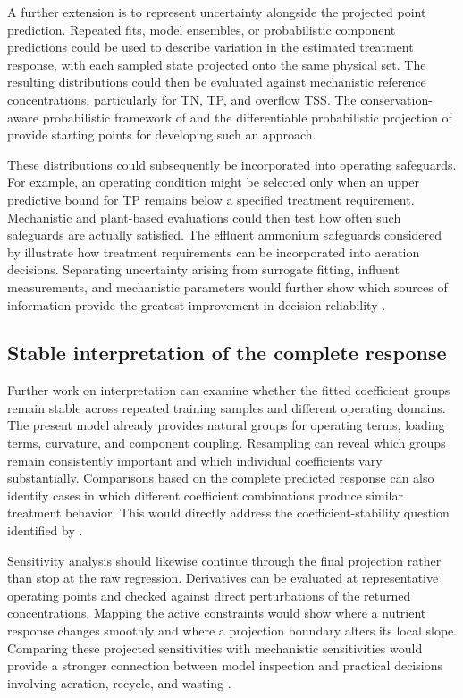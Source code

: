 A further extension is to represent uncertainty alongside the projected point prediction. Repeated fits, model ensembles, or probabilistic component predictions could be used to describe variation in the estimated treatment response, with each sampled state projected onto the same physical set. The resulting distributions could then be evaluated against mechanistic reference concentrations, particularly for TN, TP, and overflow TSS. The conservation-aware probabilistic framework of \citet{Hansen2024} and the differentiable probabilistic projection of \citet{Utkarsh2025} provide starting points for developing such an approach.

These distributions could subsequently be incorporated into operating safeguards. For example, an operating condition might be selected only when an upper predictive bound for TP remains below a specified treatment requirement. Mechanistic and plant-based evaluations could then test how often such safeguards are actually satisfied. The effluent ammonium safeguards considered by \citet{Ren2026} illustrate how treatment requirements can be incorporated into aeration decisions. Separating uncertainty arising from surrogate fitting, influent measurements, and mechanistic parameters would further show which sources of information provide the greatest improvement in decision reliability \citep{Machado2014,Petersen2003}.

\subsection{Stable interpretation of the complete response}

Further work on interpretation can examine whether the fitted coefficient groups remain stable across repeated training samples and different operating domains. The present model already provides natural groups for operating terms, loading terms, curvature, and component coupling. Resampling can reveal which groups remain consistently important and which individual coefficients vary substantially. Comparisons based on the complete predicted response can also identify cases in which different coefficient combinations produce similar treatment behavior. This would directly address the coefficient-stability question identified by \citet{Selerio2026}.

Sensitivity analysis should likewise continue through the final projection rather than stop at the raw regression. Derivatives can be evaluated at representative operating points and checked against direct perturbations of the returned concentrations. Mapping the active constraints would show where a nutrient response changes smoothly and where a projection boundary alters its local slope. Comparing these projected sensitivities with mechanistic sensitivities would provide a stronger connection between model inspection and practical decisions involving aeration, recycle, and wasting \citep{Selerio2026,Shen2023}.

